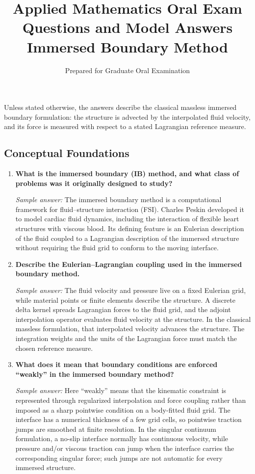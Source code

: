 \documentclass[12pt]{article}
\title{\vspace{-2em}\textbf{Applied Mathematics Oral Exam Questions and Model Answers}\\
\large Immersed Boundary Method}
\author{Prepared for Graduate Oral Examination}
\date{}
\begin{document}
\maketitle

Unless stated otherwise, the answers describe the classical massless immersed
boundary formulation: the structure is advected by the interpolated fluid
velocity, and its force is measured with respect to a stated Lagrangian
reference measure.

\subsection*{Conceptual Foundations}

\begin{enumerate}
\item \textbf{What is the immersed boundary (IB) method, and what class of problems was it originally designed to study?}

\textit{Sample answer:}
The immersed boundary method is a computational framework for fluid--structure
interaction (FSI). Charles Peskin developed it to model cardiac fluid dynamics,
including the interaction of flexible heart structures with viscous blood. Its
defining feature is an Eulerian description of the fluid coupled to a
Lagrangian description of the immersed structure without requiring the fluid
grid to conform to the moving interface.

\item \textbf{Describe the Eulerian--Lagrangian coupling used in the immersed boundary method.}

\textit{Sample answer:}
The fluid velocity and pressure live on a fixed Eulerian grid, while material
points or finite elements describe the structure. A discrete delta kernel
spreads Lagrangian forces to the fluid grid, and the adjoint interpolation
operator evaluates fluid velocity at the structure. In the classical massless
formulation, that interpolated velocity advances the structure. The integration
weights and the units of the Lagrangian force must match the chosen reference
measure.

\item \textbf{What does it mean that boundary conditions are enforced “weakly” in the immersed boundary method?}

\textit{Sample answer:}
Here ``weakly'' means that the kinematic constraint is represented through
regularized interpolation and force coupling rather than imposed as a sharp
pointwise condition on a body-fitted fluid grid. The interface has a numerical
thickness of a few grid cells, so pointwise traction jumps are smoothed at finite
resolution. In the singular continuum formulation, a no-slip interface normally
has continuous velocity, while pressure and/or viscous traction can jump when
the interface carries the corresponding singular force; such jumps are not
automatic for every immersed structure.
\end{enumerate}
\end{document}
